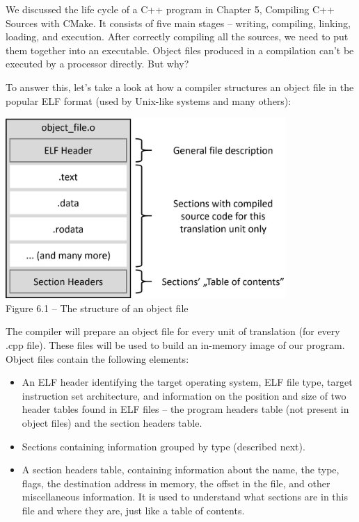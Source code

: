 We discussed the life cycle of a C++ program in Chapter 5, Compiling C++ Sources with CMake. It consists of five main stages – writing, compiling, linking, loading, and execution. After correctly compiling all the sources, we need to put them together into an executable. Object files produced in a compilation can't be executed by a processor directly. But why?

To answer this, let's take a look at how a compiler structures an object file in the popular ELF format (used by Unix-like systems and many others):

\begin{center}
\includegraphics[width=0.8\textwidth]{content/2/chapter6/images/1.jpg}\\
Figure 6.1 – The structure of an object file
\end{center}

The compiler will prepare an object file for every unit of translation (for every .cpp file). These files will be used to build an in-memory image of our program. Object files contain the following elements:

\begin{itemize}
\item 
An ELF header identifying the target operating system, ELF file type, target instruction set architecture, and information on the position and size of two header tables found in ELF files – the program headers table (not present in object files) and the section headers table.

\item 
Sections containing information grouped by type (described next).

\item 
A section headers table, containing information about the name, the type, flags, the destination address in memory, the offset in the file, and other miscellaneous information. It is used to understand what sections are in this file and where they are, just like a table of contents.
\end{itemize}


